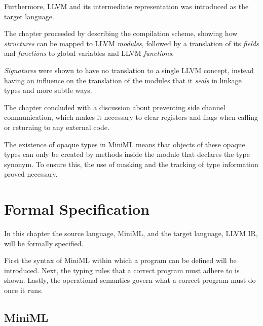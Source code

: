 \documentclass[10pt,a4paper,master=cws, masteroption=ai,english,inputenc=utf8]{kulemt}
\begin{document}
Furthermore, LLVM and its intermediate representation was introduced as the target language.

The chapter proceeded by describing the compilation scheme, showing how \emph{structures} can be mapped to LLVM \emph{modules}, followed by a translation of its \emph{fields} and \emph{functions} to global variables and LLVM \emph{functions}.

\emph{Signatures} were shown to have no translation to a single LLVM concept, instead having an influence on the translation of the modules that it \emph{seals} in linkage types and more subtle ways.

The chapter concluded with a discussion about preventing side channel communication, which makes it necessary to clear registers and flags when calling or returning to any external code.

The existence of opaque types in \mbox{MiniML} means that objects of these opaque types can only be created by methods inside the module that declares the type synonym. To ensure this, the use of masking and the tracking of type information proved necessary.

\chapter{Formal Specification \label{chapter:formalspecification}}
In this chapter the source language, \mbox{MiniML}, and the target language, LLVM IR, will be formally specified. 

First the syntax of \mbox{MiniML} within which a program can be defined will be introduced. Next, the typing rules that a correct program must adhere to is shown. Lastly, the operational semantics govern what a correct program must do once it runs.
\section{MiniML}
\end{document}
